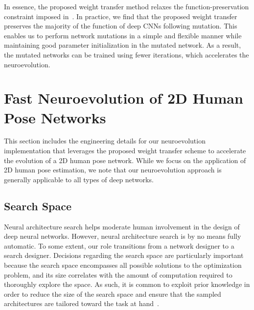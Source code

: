 \documentclass{ieeeaccess}
\begin{document}
In essence, the proposed weight transfer method relaxes the function-preservation constraint imposed in~\cite{wei2016network, wistuba2018deep}. In practice, we find that the proposed weight transfer preserves the majority of the function of deep CNNs following mutation. This enables us to perform network mutations in a simple and flexible manner while maintaining good parameter initialization in the mutated network. As a result, the mutated networks can be trained using fewer iterations, which accelerates the neuroevolution.

\section{Fast Neuroevolution of 2D Human Pose Networks}
\label{sec:method}
This section includes the engineering details for our neuroevolution implementation that leverages the proposed weight transfer scheme to accelerate the evolution of a 2D human pose network. While we focus on the application of 2D human pose estimation, we note that our neuroevolution approach is generally applicable to all types of deep networks.

\subsection{Search Space}
Neural architecture search helps moderate human involvement in the design of deep neural networks. However, neural architecture search is by no means fully automatic. To some extent, our role transitions from a network designer to a search designer. Decisions regarding the search space are particularly important because the search space encompasses all possible solutions to the optimization problem, and its size correlates with the amount of computation required to thoroughly explore the space. As such, it is common to exploit prior knowledge in order to reduce the size of the search space and ensure that the sampled architectures are tailored toward the task at hand~\cite{zoph2018learning}. 
\end{document}
